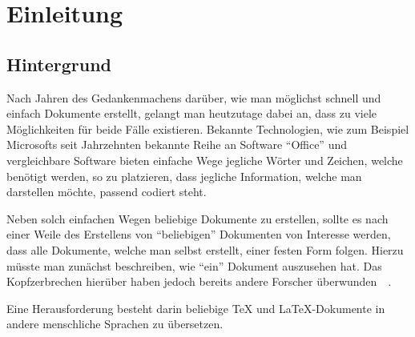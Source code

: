 \section{Einleitung}
\subsection{Hintergrund}\label{einleitung:hintergrund}
Nach Jahren des Gedankenmachens darüber, wie man möglichst schnell und einfach Dokumente erstellt, gelangt man heutzutage dabei an, dass zu viele Möglichkeiten für beide Fälle existieren. Bekannte Technologien, wie zum Beispiel Microsofts seit Jahrzehnten bekannte Reihe an Software \enquote{Office} und vergleichbare Software bieten einfache Wege jegliche Wörter und Zeichen, welche benötigt werden, so zu platzieren, dass jegliche Information, welche man darstellen möchte, passend codiert steht.

Neben solch einfachen Wegen beliebige Dokumente zu erstellen, sollte es nach einer Weile des Erstellens von \enquote{beliebigen} Dokumenten von Interesse werden, dass alle Dokumente, welche man selbst erstellt, einer festen Form folgen. Hierzu müsste man zunächst beschreiben, wie \enquote{ein} Dokument auszusehen hat. Das Kopfzerbrechen hierüber haben jedoch bereits andere Forscher überwunden~\cite{texbook}~\cite{latexCompanion:leslieLamport}.

Eine Herausforderung besteht darin beliebige \TeX{} und \LaTeX{}-Dokumente in andere menschliche Sprachen zu übersetzen. 

